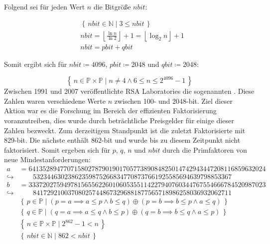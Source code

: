 Folgend sei für jeden Wert $n$ die Bitgröße $nbit$:

\begin{equation}
  \begin{split}
    &\left\{\,nbit \in \mathbb{N}\mid 3 \le nbit\, \right\}\\
    &nbit=\left\lfloor\frac{\ln{n}}{\ln{2}}\right\rfloor+1=\left\lfloor\log_2{n}\right\rfloor+1\\
    &nbit=pbit+qbit
  \end{split}
\end{equation}

Somit ergibt sich für $nbit\coloneq4096$, $pbit\coloneq2048$ und $qbit\coloneq2048$:

\begin{equation}
  \left\{\,n \in \mathbb{P} \times \mathbb{P}\mid n \ne 4 \land 6 \le n \le 2^{4096}-1\, \right\}
\end{equation}
\newpage
Zwischen 1991 und 2007 veröffentlichte RSA Laboratories die sogenannten . Diese Zahlen waren verschiedene Werte $n$ zwischen 100- und 2048-bit. Ziel dieser Aktion war es die Forschung im Bereich der effizienten Faktorisierung voranzutreiben, dies wurde durch beträchtliche Preisgelder für einige dieser Zahlen bezweckt. Zum derzeitigem Standpunkt ist  die zuletzt Faktorisierte  mit 829-bit\cite{rsa250}. Die nächste   enthält $862$-bit und wurde bis zu diesem Zeitpunkt nicht faktorisiert. Somit ergeben sich für $p$, $q$, $n$ und $nbit$ durch die Primfaktoren von  neue Mindestanforderungen:
\begin{equation}
  \begin{split}
    a&=64135289477071580278790190170577389084825014742943447208116859632024\\\hookrightarrow&\phantom{=}\;\,\,532344630238623598752668347708737661925585694639798853367\\
    b&=33372027594978156556226010605355114227940760344767554666784520987023\\\hookrightarrow&\phantom{=}\;\,\,841729210037080257448673296881877565718986258036932062711\\
    &\left\{\,p \in \mathbb{P}\mid (p=a \implies a \le p \land b \le q) \oplus (p=b \implies b \le p \land a \le q)\, \right\}\\
    &\left\{\,q \in \mathbb{P}\mid (q=a \implies a \le q \land b \le p) \oplus (q=b \implies b \le q \land a \le p)\, \right\}\\
    &\left\{\,n \in \mathbb{P} \times \mathbb{P}\mid 2^{862}-1 < n\, \right\}\\
    &\left\{\,nbit \in \mathbb{N}\mid 862 < nbit\, \right\}
  \end{split}
\end{equation}

